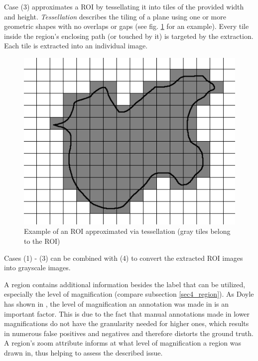 Case (3) approximates a ROI by tessellating it into tiles of the provided width and height. \emph{Tessellation} describes the tiling of a plane using one or more geometric shapes with no overlaps or gaps (see fig. \ref{fig5_tesExample} for an example)\cite{Clifford09}. Every tile inside the region's enclosing path (or touched by it) is targeted by the extraction. Each tile is extracted into an individual image.

\begin{figure}[H]
	\begin{center}
		\includegraphics[scale=0.5]{img/tessellation.png}
		\caption{Example of an ROI approximated via tessellation (gray tiles belong to the ROI)}
		\label{fig5_tesExample}
	\end{center}
\end{figure}

Cases (1) - (3) can be combined with (4) to convert the extracted ROI images into grayscale images.

A region contains additional information besides the label that can be utilized, especially the level of magnification (compare subsection \ref{sec4_region}). As Doyle has shown in \cite{Doyle10}, the level of magnification an annotation was made in is an important factor. This is due to the fact that manual annotations made in lower magnifications do not have the granularity needed for higher ones, which results in numerous false positives and negatives and therefore distorts the ground truth\cite{Janowczyk16}. A region's zoom attribute informs at what level of magnification a region was drawn in, thus helping to assess the described issue.

